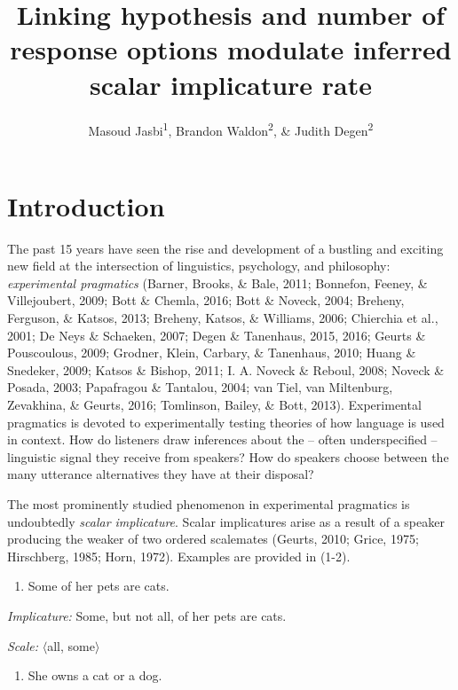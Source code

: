 \documentclass[man]{apa6}
\title{Linking hypothesis and number of response options modulate inferred
scalar implicature rate}
\author{Masoud Jasbi\textsuperscript{1}, Brandon Waldon\textsuperscript{2}, \& Judith Degen\textsuperscript{2}}
\affiliation{
    \vspace{0.5cm}
       \textsuperscript{1} Harvard University, Department of Linguistics\\ 
	\textsuperscript{2} Stanford University, Department of Linguistics }
\providecommand{\tightlist}{%
  \setlength{\itemsep}{0pt}\setlength{\parskip}{0pt}}
\theoremstyle{definition}
\theoremstyle{definition}
\theoremstyle{definition}
\theoremstyle{remark}
\begin{document}
\maketitle

\setcounter{secnumdepth}{0}



\section{Introduction}\label{introduction}

The past 15 years have seen the rise and development of a bustling and
exciting new field at the intersection of linguistics, psychology, and
philosophy: \emph{experimental pragmatics} (Barner, Brooks, \& Bale,
2011; Bonnefon, Feeney, \& Villejoubert, 2009; Bott \& Chemla, 2016;
Bott \& Noveck, 2004; Breheny, Ferguson, \& Katsos, 2013; Breheny,
Katsos, \& Williams, 2006; Chierchia et al., 2001; De Neys \& Schaeken,
2007; Degen \& Tanenhaus, 2015, 2016; Geurts \& Pouscoulous, 2009;
Grodner, Klein, Carbary, \& Tanenhaus, 2010; Huang \& Snedeker, 2009;
Katsos \& Bishop, 2011; I. A. Noveck \& Reboul, 2008; Noveck \& Posada,
2003; Papafragou \& Tantalou, 2004; van Tiel, van Miltenburg, Zevakhina, \&
Geurts, 2016; Tomlinson, Bailey, \& Bott, 2013). Experimental pragmatics
is devoted to experimentally testing theories of how language is used in
context. How do listeners draw inferences about the -- often
underspecified -- linguistic signal they receive from speakers? How do
speakers choose between the many utterance alternatives they have at
their disposal?

The most prominently studied phenomenon in experimental pragmatics is
undoubtedly \emph{scalar implicature}. Scalar implicatures arise as a
result of a speaker producing the weaker of two ordered scalemates
(Geurts, 2010; Grice, 1975; Hirschberg, 1985; Horn, 1972). Examples are
provided in (1-2).

\begin{enumerate}
\def\labelenumi{(\arabic{enumi})}
\tightlist
\item
  Some of her pets are cats.
\end{enumerate}

\emph{Implicature:} Some, but not all, of her pets are cats.

\emph{Scale:} $\langle$all, some$\rangle$

\begin{enumerate}
\def\labelenumi{(\arabic{enumi})}
\setcounter{enumi}{1}
\tightlist
\item
  She owns a cat or a dog.
\end{enumerate}
\end{document}
